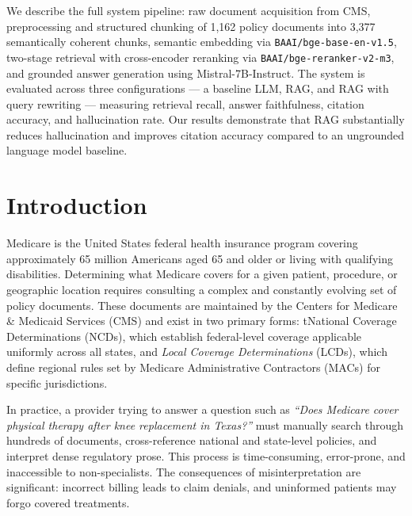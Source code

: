 \documentclass[10pt, letterpaper]{article}
\begin{document}
We describe the full system pipeline: raw document acquisition from CMS, preprocessing and
structured chunking of 1,162 policy documents into 3,377 semantically coherent chunks,
semantic embedding via \texttt{BAAI/bge-base-en-v1.5}, two-stage retrieval with cross-encoder
reranking via \texttt{BAAI/bge-reranker-v2-m3}, and grounded answer generation using
Mistral-7B-Instruct. The system is evaluated across three configurations --- a baseline LLM,
RAG, and RAG with query rewriting --- measuring retrieval recall, answer faithfulness,
citation accuracy, and hallucination rate. Our results demonstrate that RAG substantially
reduces hallucination and improves citation accuracy compared to an ungrounded language
model baseline.

\vspace{1cm}

\newpage

\tableofcontents
 
\newpage
 
\section{Introduction}
 
Medicare is the United States federal health insurance program covering approximately
65 million Americans aged 65 and older or living with qualifying disabilities. Determining
what Medicare covers for a given patient, procedure, or geographic location requires
consulting a complex and constantly evolving set of policy documents. These documents
are maintained by the Centers for Medicare \& Medicaid Services (CMS) and exist in two
primary forms: \texti
t{National Coverage Determinations} (NCDs), which establish
federal-level coverage applicable uniformly across all states, and \textit{Local Coverage
Determinations} (LCDs), which define regional rules set by Medicare Administrative
Contractors (MACs) for specific jurisdictions.
 
In practice, a provider trying to answer a question such as \textit{``Does Medicare cover
physical therapy after knee replacement in Texas?''} must manually search through
hundreds of documents, cross-reference national and state-level policies, and interpret
dense regulatory prose. This process is time-consuming, error-prone, and inaccessible
to non-specialists. The consequences of misinterpretation are significant: incorrect
billing leads to claim denials, and uninformed patients may forgo covered treatments.
 
\end{document}
